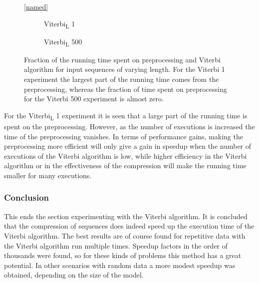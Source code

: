 \begin{figure}
  \centering\ref{named}
  \begin{subfigure}{0.5\textwidth}
    \centering 
    \caption{Viterbi\textsubscript{L} 1}
  \end{subfigure}%
  \begin{subfigure}{0.5\textwidth}
    \centering 
    \caption{Viterbi\textsubscript{L} 500}
  \end{subfigure}

  \caption{Fraction of the running time spent on preprocessing and Viterbi
    algorithm for input sequences of varying length. For the Viterbi 1
    experiment the largest part of the running time comes from the
    preprocessing, whereas the fraction of time spent on preprocessing for
    the Viterbi 500 experiment is almost zero.}
  \label{fig:pre_vs_running}
\end{figure}

For the Viterbi\textsubscript{L} 1 experiment it is seen that a large part of the running time
is spent on the preprocessing. However, as the number of executions is
increased the time of the preprocessing vanishes. In terms of performance
gains, making the preprocessing more efficient will only give a gain in speedup
when the number of executions of the Viterbi algorithm is low, while higher
efficiency in the Viterbi algorithm or in the effectiveness of the compression
will make the running time smaller for many executions.

\subsubsection{Conclusion}

This ends the section experimenting with the Viterbi algorithm. It is concluded
that the compression of sequences does indeed speed up the execution time of
the Viterbi algorithm. The best results are of course found for repetitive data
with the Viterbi algorithm run multiple times. Speedup factors in the order of
thousands were found, so for these kinds of problems this method has a great
potential. In other scenarios with random data a more modest speedup was
obtained, depending on the size of the model.

